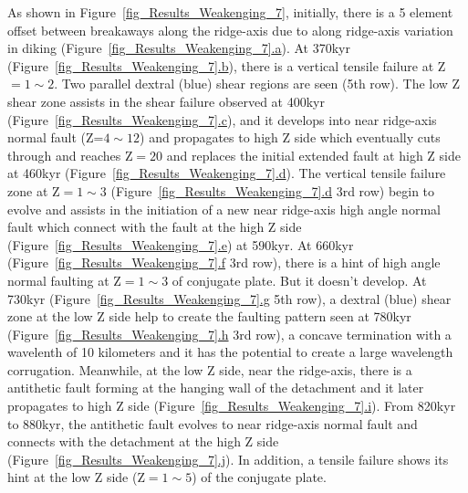 As shown in Figure~\hyperref[fig_Results_Weakenging_7]{\ref{fig_Results_Weakenging_7}}, initially, there is a 5 element offset between breakaways along the ridge-axis due to along ridge-axis variation in diking (Figure~\hyperref[fig_Results_Weakenging_7]{\ref{fig_Results_Weakenging_7}.a}). At 370kyr (Figure~\hyperref[fig_Results_Weakenging_7]{\ref{fig_Results_Weakenging_7}.b}), there is a vertical tensile failure at Z$=1\sim2$. Two parallel dextral (blue) shear regions are seen (5th row). The low Z shear zone assists in the shear failure observed at 400kyr (Figure~\hyperref[fig_Results_Weakenging_7]{\ref{fig_Results_Weakenging_7}.c}), and it develops into near ridge-axis normal fault (Z=$4\sim12$) and propagates to high Z side which eventually cuts through and reaches Z$=20$ and replaces the initial extended fault at high Z side at 460kyr (Figure~\hyperref[fig_Results_Weakenging_7]{\ref{fig_Results_Weakenging_7}.d}). The vertical tensile failure zone at Z$=1\sim3$ (Figure~\hyperref[fig_Results_Weakenging_7]{\ref{fig_Results_Weakenging_7}.d} 3rd row) begin to evolve and assists in the initiation of a new near ridge-axis high angle normal fault which connect with the fault at the high Z side (Figure~\hyperref[fig_Results_Weakenging_7]{\ref{fig_Results_Weakenging_7}.e}) at 590kyr. At 660kyr (Figure~\hyperref[fig_Results_Weakenging_7]{\ref{fig_Results_Weakenging_7}.f} 3rd row), there is a hint of high angle normal faulting at Z$=1\sim3$ of conjugate plate. But it doesn't develop. At 730kyr (Figure~\hyperref[fig_Results_Weakenging_7]{\ref{fig_Results_Weakenging_7}.g} 5th row), a dextral (blue) shear zone at the low Z side help to create the faulting pattern seen at 780kyr (Figure~\hyperref[fig_Results_Weakenging_7]{\ref{fig_Results_Weakenging_7}.h} 3rd row), a concave termination with a wavelenth of 10 kilometers and it has the potential to create a large wavelength corrugation. Meanwhile, at the low Z side, near the ridge-axis, there is a antithetic fault forming at the hanging wall of the detachment and it later propagates to high Z side (Figure~\hyperref[fig_Results_Weakenging_7]{\ref{fig_Results_Weakenging_7}.i}). From 820kyr to 880kyr, the antithetic fault evolves to near ridge-axis normal fault and connects with the detachment at the high Z side (Figure~\hyperref[fig_Results_Weakenging_7]{\ref{fig_Results_Weakenging_7}.j}). In addition, a tensile failure shows its hint at the low Z side (Z$=1\sim5$) of the conjugate plate.         

